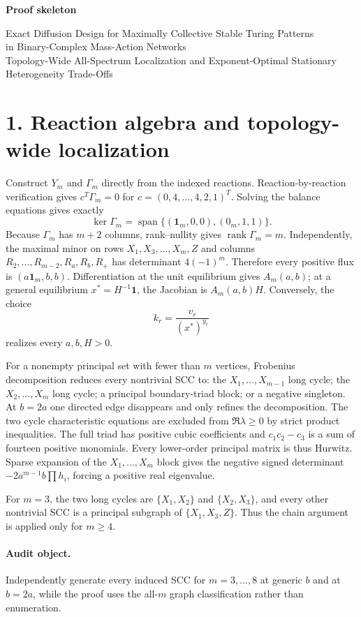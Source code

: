 \documentclass[10pt]{article}
\begin{document}
\begin{center}
{\Large\bf Proof skeleton}\par
{\large Exact Diffusion Design for Maximally Collective Stable Turing Patterns}\\
{\normalsize in Binary-Complex Mass-Action Networks}\\
{\small Topology-Wide All-Spectrum Localization and
Exponent-Optimal Stationary Heterogeneity Trade-Offs}
\end{center}

\section*{1. Reaction algebra and topology-wide localization}
Construct $Y_m$ and $\Gamma_m$ directly from the indexed reactions.
Reaction-by-reaction verification gives $c^T\Gamma_m=0$ for
$c=(0,4,\ldots,4,2,1)^T$.  Solving the balance equations gives exactly
\[
\ker\Gamma_m=\operatorname{span}\{(\mathbf1_m,0,0),(0_m,1,1)\}.
\]
Because $\Gamma_m$ has $m+2$ columns, rank--nullity gives
$\operatorname{rank}\Gamma_m=m$.  Independently, the maximal minor on rows
$X_1,X_3,\ldots,X_m,Z$ and columns
$R_2,\ldots,R_{m-2},R_a,R_b,R_+$ has determinant $4(-1)^m$.
Therefore every positive flux is $(a\mathbf1_m,b,b)$.  Differentiation at the
unit equilibrium gives $A_m(a,b)$; at a general equilibrium
$x^*=H^{-1}\mathbf1$, the Jacobian is $A_m(a,b)H$.  Conversely, the choice
\[
 k_r=\frac{v_r}{(x^*)^{y_r}}
\]
realizes every $a,b,H>0$.

For a nonempty principal set with fewer than $m$ vertices, Frobenius decomposition reduces every nontrivial SCC to: the $X_1,\ldots,X_{m-1}$ long cycle; the $X_2,\ldots,X_m$ long cycle; a principal boundary-triad block; or a negative singleton. At $b=2a$ one directed edge disappears and only refines the decomposition. The two cycle characteristic equations are excluded from $\Re\lambda\ge0$ by strict product inequalities. The full triad has positive cubic coefficients and $c_1c_2-c_3$ is a sum of fourteen positive monomials. Every lower-order principal matrix is thus Hurwitz. Sparse expansion of the $X_1,\ldots,X_m$ block gives the negative signed determinant $-2a^{m-1}b\prod h_i$, forcing a positive real eigenvalue.

For $m=3$, the two long cycles are $\{X_1,X_2\}$ and $\{X_2,X_3\}$,
and every other nontrivial SCC is a principal subgraph of
$\{X_1,X_3,Z\}$.  Thus the chain argument is applied only for $m\ge4$.

\paragraph{Audit object.} Independently generate every induced SCC for $m=3,\ldots,8$ at generic $b$ and at $b=2a$, while the proof uses the all-$m$ graph classification rather than enumeration.
\end{document}
